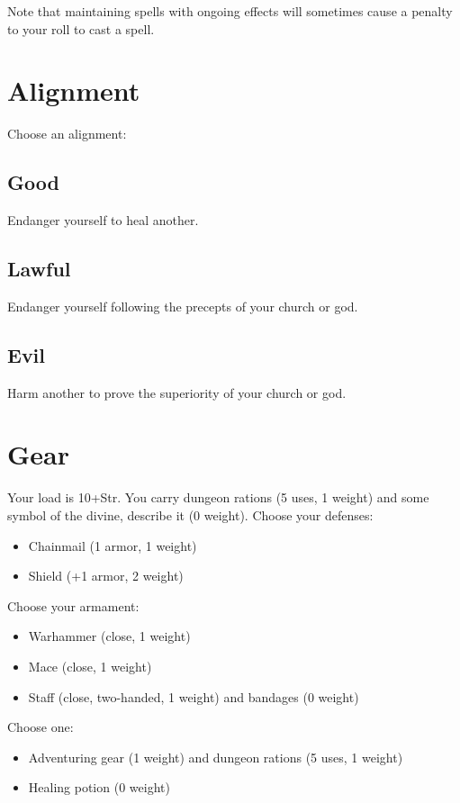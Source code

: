  Note that maintaining spells with ongoing effects will sometimes cause a penalty to your roll to cast a spell.
\section{Alignment}


 Choose an alignment:
\subsection{Good}


 Endanger yourself to heal another.
\subsection{Lawful}


 Endanger yourself following the precepts of your church or god.
\subsection{Evil}


 Harm another to prove the superiority of your church or god.
\section{Gear}


 Your load is 10+Str. You carry dungeon rations (5 uses, 1 weight) and some symbol of the divine, describe it (0 weight). Choose your defenses:
\begin{itemize}
\item Chainmail (1 armor, 1 weight)
\item Shield (+1 armor, 2 weight)

\end{itemize}


 Choose your armament:
\begin{itemize}
\item Warhammer (close, 1 weight)
\item Mace (close, 1 weight)
\item Staff (close, two-handed, 1 weight) and bandages (0 weight)

\end{itemize}


 Choose one:
\begin{itemize}
\item Adventuring gear (1 weight) and dungeon rations (5 uses, 1 weight)
\item Healing potion (0 weight)

\end{itemize}
